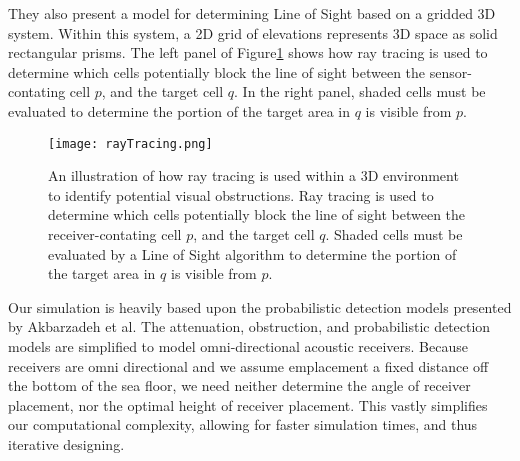 They also present a model for determining Line of Sight based on a gridded 3D system.  Within this system, a 2D grid of elevations represents 3D space as solid rectangular prisms.  The left panel of Figure\ref{rayTracingImg} shows how ray tracing is used to determine which cells potentially block the line of sight between the sensor-contating cell $p$, and the target cell $q$.  In the right panel, shaded cells must be evaluated to determine the portion of the target area in $q$ is visible from $p$.
\begin{figure}[t]
	\label{rayTracingImg}
	\centering
	\texttt{[image: rayTracing.png]}
	\caption{An illustration of how ray tracing is used within a 3D environment to identify potential visual obstructions.  Ray tracing is used to determine which cells potentially block the line of sight between the receiver-contating cell $p$, and the target cell $q$.  Shaded cells must be evaluated by a Line of Sight algorithm to determine the portion of the target area in $q$ is visible from $p$. \cite{Akbarzadeh2013}}
\end{figure}

Our simulation is heavily based upon the probabilistic detection models presented by Akbarzadeh et al.  The attenuation, obstruction, and probabilistic detection models are simplified to model omni-directional acoustic receivers.  Because receivers are omni directional and we assume emplacement a fixed distance off the bottom of the sea floor, we need neither determine the angle of receiver placement, nor the optimal height of receiver placement.  This vastly simplifies our computational complexity, allowing for faster simulation times, and thus iterative designing.


